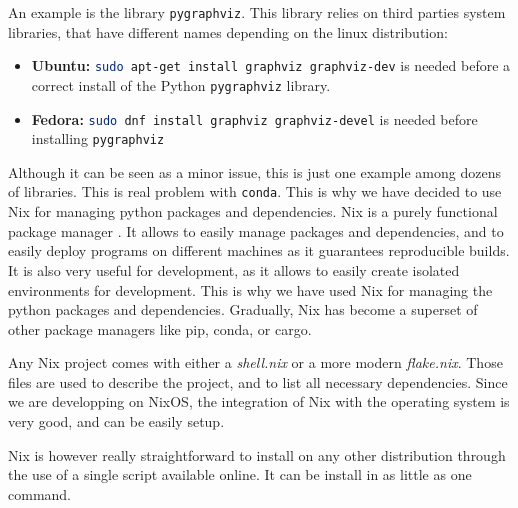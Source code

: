     An example is the library \texttt{pygraphviz}. This library relies on third parties system libraries, that have different names depending on the linux distribution:
    
    \begin{itemize}
        \item \textbf{Ubuntu:} \lstinline[language=bash]|sudo apt-get install graphviz graphviz-dev| is needed before a correct install of the Python \texttt{pygraphviz} library. 
        \item \textbf{Fedora:} \lstinline[language=bash]|sudo dnf install graphviz graphviz-devel| is needed before installing \texttt{pygraphviz}
    \end{itemize}

    Although it can be seen as a minor issue, this is just one example among dozens of libraries. This is real problem with \texttt{conda}. This is why we have decided to use Nix for managing python packages and dependencies. Nix is a purely functional package manager \cite{NixOriginalThesis06}. It allows to easily manage packages and dependencies, and to easily deploy programs on different machines as it guarantees reproducible builds. It is also very useful for development, as it allows to easily create isolated environments for development. This is why we have used Nix for managing the python packages and dependencies. Gradually, Nix has become a superset of other package managers like pip, conda, or cargo. 
    
    Any Nix project comes with either a \textit{shell.nix} or a more modern \textit{flake.nix}. Those files are used to describe the project, and to list all necessary dependencies. Since we are developping on NixOS, the integration of Nix with the operating system is very good, and can be easily setup.
    
    Nix is however really straightforward to install on any other distribution through the use of a single script available online. It can be install in as little as one command.





